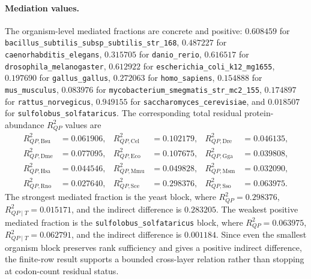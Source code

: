 \paragraph{Mediation values.}
The organism-level mediated fractions are concrete and positive: $0.608459$ for \texttt{bacillus\_subtilis\_subsp\_subtilis\_str\_168}, $0.487227$ for \texttt{caenorhabditis\_elegans}, $0.315705$ for \texttt{danio\_rerio}, $0.616517$ for \texttt{drosophila\_melanogaster}, $0.612922$ for \texttt{escherichia\_coli\_k12\_mg1655}, $0.197690$ for \texttt{gallus\_gallus}, $0.272063$ for \texttt{homo\_sapiens}, $0.154888$ for \texttt{mus\_musculus}, $0.083976$ for \texttt{mycobacterium\_smegmatis\_str\_mc2\_155}, $0.174897$ for \texttt{rattus\_norvegicus}, $0.949155$ for \texttt{saccharomyces\_cerevisiae}, and $0.018507$ for \texttt{sulfolobus\_solfataricus}.  The corresponding total residual protein-abundance $R^2_{QP}$ values are
$$\begin{aligned}
R^2_{QP,\mathrm{Bsu}} &= 0.061906,& R^2_{QP,\mathrm{Cel}} &= 0.102179,& R^2_{QP,\mathrm{Dre}} &= 0.046135,\\
R^2_{QP,\mathrm{Dme}} &= 0.077095,& R^2_{QP,\mathrm{Eco}} &= 0.107675,& R^2_{QP,\mathrm{Gga}} &= 0.039808,\\
R^2_{QP,\mathrm{Hsa}} &= 0.044546,& R^2_{QP,\mathrm{Mmu}} &= 0.049828,& R^2_{QP,\mathrm{Msm}} &= 0.032090,\\
R^2_{QP,\mathrm{Rno}} &= 0.027640,& R^2_{QP,\mathrm{Sce}} &= 0.298376,& R^2_{QP,\mathrm{Sso}} &= 0.063975.
\end{aligned}$$
The strongest mediated fraction is the yeast block, where $R^2_{QP}=0.298376$, $R^2_{QP\mid T}=0.015171$, and the indirect difference is $0.283205$.  The weakest positive mediated fraction is the \texttt{sulfolobus\_solfataricus} block, where $R^2_{QP}=0.063975$, $R^2_{QP\mid T}=0.062791$, and the indirect difference is $0.001184$.  Since even the smallest organism block preserves rank sufficiency and gives a positive indirect difference, the finite-row result supports a bounded cross-layer relation rather than stopping at codon-count residual status.

